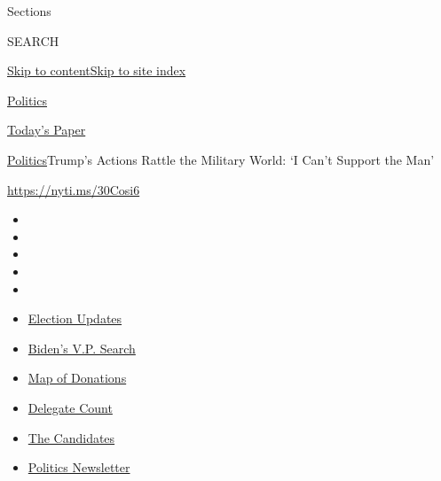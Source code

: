 Sections

SEARCH

\protect\hyperlink{site-content}{Skip to
content}\protect\hyperlink{site-index}{Skip to site index}

\href{https://www.nytimes.com/section/politics}{Politics}

\href{https://myaccount.nytimes.com/auth/login?response_type=cookie\&client_id=vi}{}

\href{https://www.nytimes.com/section/todayspaper}{Today's Paper}

\href{/section/politics}{Politics}\textbar{}Trump's Actions Rattle the
Military World: `I Can't Support the Man'

\url{https://nyti.ms/30Cosi6}

\begin{itemize}
\item
\item
\item
\item
\item
\end{itemize}

\begin{itemize}
\item
  \href{https://www.nytimes.com/2020/07/31/us/elections/biden-vs-trump.html?action=click\&pgtype=Article\&state=default\&region=TOP_BANNER\&context=storylines_menu}{Election
  Updates}
\item
  \href{https://www.nytimes.com/article/biden-vice-president-2020.html?action=click\&pgtype=Article\&state=default\&region=TOP_BANNER\&context=storylines_menu}{Biden's
  V.P. Search}
\item
  \href{https://www.nytimes.com/interactive/2020/07/24/us/politics/trump-biden-campaign-donors.html?action=click\&pgtype=Article\&state=default\&region=TOP_BANNER\&context=storylines_menu}{Map
  of Donations}
\item
  \href{https://www.nytimes.com/interactive/2020/us/elections/delegate-count-primary-results.html?action=click\&pgtype=Article\&state=default\&region=TOP_BANNER\&context=storylines_menu}{Delegate
  Count}
\item
  \href{https://www.nytimes.com/interactive/2019/us/politics/2020-presidential-candidates.html?action=click\&pgtype=Article\&state=default\&region=TOP_BANNER\&context=storylines_menu}{The
  Candidates}
\item
  \href{https://www.nytimes.com/newsletters/politics?action=click\&pgtype=Article\&state=default\&region=TOP_BANNER\&context=storylines_menu}{Politics
  Newsletter}
\end{itemize}

